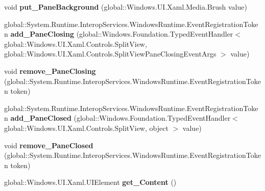 \begin{DoxyCompactItemize}
void {\bfseries put\+\_\+\+Pane\+Background} (global\+::\+Windows.\+U\+I.\+Xaml.\+Media.\+Brush value)
\item 
\mbox{\label{interface_windows_1_1_u_i_1_1_xaml_1_1_controls_1_1_i_split_view_a69ee46b94201df4d3b787eb9e974289a}} 
global\+::\+System.\+Runtime.\+Interop\+Services.\+Windows\+Runtime.\+Event\+Registration\+Token {\bfseries add\+\_\+\+Pane\+Closing} (global\+::\+Windows.\+Foundation.\+Typed\+Event\+Handler$<$ global\+::\+Windows.\+U\+I.\+Xaml.\+Controls.\+Split\+View, global\+::\+Windows.\+U\+I.\+Xaml.\+Controls.\+Split\+View\+Pane\+Closing\+Event\+Args $>$ value)
\item 
\mbox{\label{interface_windows_1_1_u_i_1_1_xaml_1_1_controls_1_1_i_split_view_a6264ad76174d999d605b9e7745a813f6}} 
void {\bfseries remove\+\_\+\+Pane\+Closing} (global\+::\+System.\+Runtime.\+Interop\+Services.\+Windows\+Runtime.\+Event\+Registration\+Token token)
\item 
\mbox{\label{interface_windows_1_1_u_i_1_1_xaml_1_1_controls_1_1_i_split_view_a5a3d86d9589e5de24342d96eaf2c1c61}} 
global\+::\+System.\+Runtime.\+Interop\+Services.\+Windows\+Runtime.\+Event\+Registration\+Token {\bfseries add\+\_\+\+Pane\+Closed} (global\+::\+Windows.\+Foundation.\+Typed\+Event\+Handler$<$ global\+::\+Windows.\+U\+I.\+Xaml.\+Controls.\+Split\+View, object $>$ value)
\item 
\mbox{\label{interface_windows_1_1_u_i_1_1_xaml_1_1_controls_1_1_i_split_view_a6450b9b0d59bee0c4df61f67cba5609e}} 
void {\bfseries remove\+\_\+\+Pane\+Closed} (global\+::\+System.\+Runtime.\+Interop\+Services.\+Windows\+Runtime.\+Event\+Registration\+Token token)
\item 
\mbox{\label{interface_windows_1_1_u_i_1_1_xaml_1_1_controls_1_1_i_split_view_ab894c1ae83bd61f588e1be844b3d9a6f}} 
global\+::\+Windows.\+U\+I.\+Xaml.\+U\+I\+Element {\bfseries get\+\_\+\+Content} ()
\item 
\mbox{\label{interface_windows_1_1_u_i_1_1_xaml_1_1_controls_1_1_i_split_view_a49750de7e2ee3bd1224af98270b5d354}} 

\end{DoxyCompactItemize}
